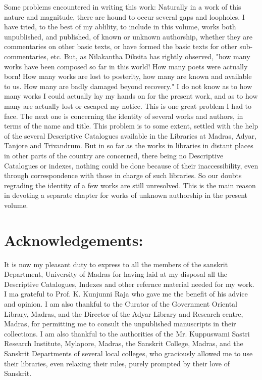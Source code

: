 Some problems encountered in writing this work:
Naturally in a work of this nature and magnitude, there are hound to occur several gaps and loopholes. I have tried, to the best of my ablility, to include in this volume, works both unpublished, and published, of known or unknown authorship, whether they are commentaries on other basic texts, or have formed the basic texts for other sub-commentaries, etc. But, as Nilakantha Diksita has rightly observed, "how many works have been composed so far in this world! How many poets were actually born! How many works are lost to posterity, how many are known and available to us. How many are badly damaged beyond recovery." I do not know as to how many works I could actually lay my hands on for the present work, and as to how many are actually lost or escaped my notice. This is one great problem I had to face. The next one is concerning the identity of several works and authors, in terms of the name and title. This problem is to some extent, settled with the help of the several Descriptive Catalogues available in the Libraries at Madras, Adyar, Tanjore and Trivandrum. But in so far as the works in libraries in distant places in other parts of the country are concerned, there being no Descriptive Catalogues or indexes, nothing could be done because of their inaccessibility, even through correspondence with those in charge of such libraries. So our doubts regrading the identity of a few works are still unresolved. This is the main reason in devoting a separate chapter for works of unknown authorship in the present volume. 

\section{Acknowledgements:} 
It is now my pleasant duty to express to all the members of the sanskrit Department, University of Madras for having laid at my disposal all the Descriptive Catalogues, Indexes and other refernce material needed for my work. I ma grateful to Prof. K. Kunjunni Raja who gave me the benefit of his advice and opinion. I am also thankful to the Curator of the Government Oriental Library, Madras, and the Director of the Adyar Library and Research centre, Madras, for permitting me to consult the unpublished manuscripts in their collections. I am also thankful to the authorities of the Mr. Kuppuswami Sastri Research Institute, Mylapore, Madras, the Sanskrit College, Madras, and the Sanskrit Departments of several local colleges, who graciously allowed me to use their libraries, even relaxing their rules, purely prompted by their love of Sanskrit. 

